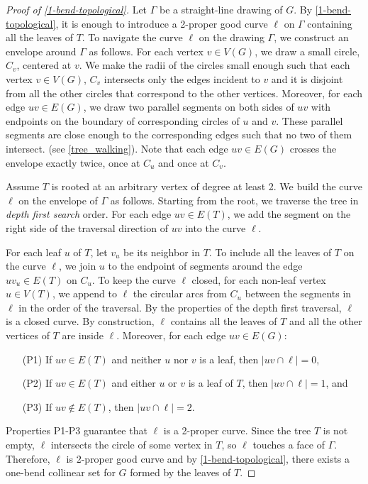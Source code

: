 \documentclass[a4paper,UKenglish,cleveref, autoref, thm-restate]{lipics-v2021}
\begin{document}
\begin{proof}[Proof of \cref{1-bend-topological}]
    Let $\Gamma$ be a straight-line drawing of $G$.
    By \cref{1-bend-topological}, it is enough to introduce a 2-proper good curve $\ell$ on $\Gamma$ containing all the leaves of $T$. To navigate the curve $\ell$ on the drawing $\Gamma$, we construct an envelope around $\Gamma$ as follows. For each vertex $v \in V(G)$, we draw a small circle, $C_v$, centered at $v$. We make the radii of the circles small enough such that each vertex $v \in V(G)$, $C_v$ intersects only the edges incident to $v$ and it is disjoint from all the other circles that correspond to the other vertices. Moreover, for each edge $uv \in E(G)$, we draw two parallel segments on both sides of $uv$ with endpoints on the boundary of corresponding circles of $u$ and $v$. These parallel segments are close enough to the corresponding edges such that no two of them intersect. (see \cref{tree_walking}). Note that each edge $uv \in E(G)$ crosses the envelope exactly twice, once at $C_u$ and once at $C_v$.

    Assume $T$ is rooted at an arbitrary vertex of degree at least 2. We build the curve $\ell$ on the envelope of $\Gamma$ as follows. Starting from the root, we traverse the tree in \textit{depth first search} order. For each edge $uv \in E(T)$, we add the segment on the right side of the traversal direction of $uv$ into the curve $\ell$.

    For each leaf $u$ of $T$, let $v_u$ be its neighbor in $T$. To include all the leaves of $T$ on the curve $\ell$, we join $u$ to the endpoint of segments around the edge $uv_u \in E(T)$ on $C_u$. To keep the curve $\ell$ closed, for each non-leaf vertex $u \in V(T)$, we append to $\ell$ the circular arcs from $C_u$ between the segments in $\ell$ in the order of the traversal. By the properties of the depth first traversal, $\ell$ is a closed curve. By construction, $\ell$ contains all the leaves of $T$ and all the other vertices of $T$ are inside $\ell$. Moreover, for each edge $uv \in E(G)$:

    \begin{enumerate}
        \item [(P1)] If $uv \in E(T)$ and neither $u$ nor $v$ is a leaf, then $|uv \cap \ell| = 0$,

        \item [(P2)] If $uv \in E(T)$ and either $u$ or $v$ is a leaf of $T$, then $|uv \cap \ell| = 1$, and

        \item [(P3)] If $uv \notin E(T)$, then $|uv \cap \ell| = 2$.
    \end{enumerate}

    Properties P1-P3 guarantee that $\ell$ is a 2-proper curve. Since the tree $T$ is not empty, $\ell$ intersects the circle of some vertex in $T$, so $\ell$ touches a face of $\Gamma$. Therefore, $\ell$ is $2$-proper good curve and by \cref{1-bend-topological}, there exists a one-bend collinear set for $G$ formed by the leaves of $T$.
\end{proof}



% 
\end{document}
